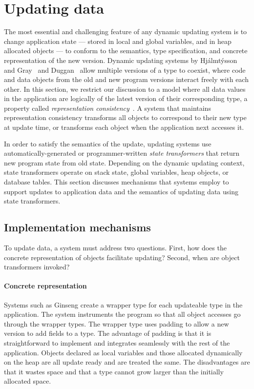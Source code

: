 
\section{Updating data}
\label{sec:updating-data}

The most essential and challenging feature of any dynamic updating system is to change
application state --- stored in local and global variables, and in heap
allocated objects --- to conform to the semantics, type specification, and
concrete representation of the new version. Dynamic updating systems by
Hj\'{a}lmt\'{y}sson and Gray~\cite{HjalmtyssonG98} and
Duggan~\cite{DBLP:journals/acta/Duggan05} allow multiple versions of a type
to coexist, where code and data objects from the old and new program
versions interact freely with each other. In this section, we restrict our
discussion to a model where all data values in the application are
logically of the latest version of their corresponding type, a property
called {\em representation consistency}~\cite{mutatis}. A system that
maintains representation consistency transforms all objects to correspond to their new
type at update time, or transforms each object when the
application next accesses it.

In order to satisfy the semantics of the update, updating systems use
automatically-generated or programmer-written \emph{state transformers}
that return new program state from old state.  Depending on the dynamic
updating context, state transformers operate on stack
state, global variables, heap objects, or database tables. This section
discusses mechanisms that systems employ to support updates to application
data and the semantics of updating data using state transformers.

\subsection{Implementation mechanisms}
To update data, a system must address two questions. First, how does the
concrete representation of objects facilitate updating? Second, when are
object transformers invoked?

\paragraph{Concrete representation}
Systems such as Ginseng create a wrapper type for each updateable type in
the application. The system instruments the program so that all object
accesses go through the wrapper types. The wrapper type uses padding to
allow a new version to add fields to a type. The advantage of padding is
that it is straightforward to implement and integrates seamlessly with the
rest of the application. Objects declared as local variables and those
allocated dynamically on the heap are all update ready and are treated the
same. The disadvantages are that it wastes space and that a type cannot
grow larger than the initially allocated space.

